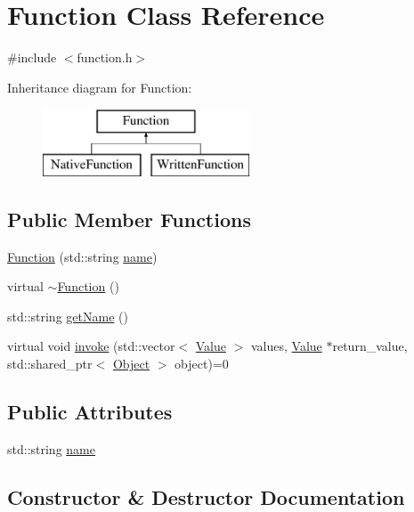 \hypertarget{classFunction}{}\section{Function Class Reference}
\label{classFunction}


{\ttfamily \#include $<$function.\+h$>$}

Inheritance diagram for Function\+:\begin{figure}[H]
\begin{center}
\leavevmode
\includegraphics[height=2.000000cm]{classFunction}
\end{center}
\end{figure}
\subsection*{Public Member Functions}
\begin{DoxyCompactItemize}
\item 
\hyperlink{classFunction_aa339244413ee4f0e959a2f61dd874b43}{Function} (std\+::string \hyperlink{classFunction_a161d1ceb4f67f3222caf429fea7b71f1}{name})
\item 
virtual \hyperlink{classFunction_a8697b2e490a4314a7ccbb17aea8ce537}{$\sim$\+Function} ()
\item 
std\+::string \hyperlink{classFunction_a5b7d859d767e8a9c19fc5b81a0d10395}{get\+Name} ()
\item 
virtual void \hyperlink{classFunction_a84f9a63e68becc27e58ea738ba4cd698}{invoke} (std\+::vector$<$ \hyperlink{classValue}{Value} $>$ values, \hyperlink{classValue}{Value} $\ast$return\+\_\+value, std\+::shared\+\_\+ptr$<$ \hyperlink{classObject}{Object} $>$ object)=0
\end{DoxyCompactItemize}
\subsection*{Public Attributes}
\begin{DoxyCompactItemize}
\item 
std\+::string \hyperlink{classFunction_a161d1ceb4f67f3222caf429fea7b71f1}{name}
\end{DoxyCompactItemize}


\subsection{Constructor \& Destructor Documentation}
\mbox{\label{classFunction_aa339244413ee4f0e959a2f61dd874b43}} 
